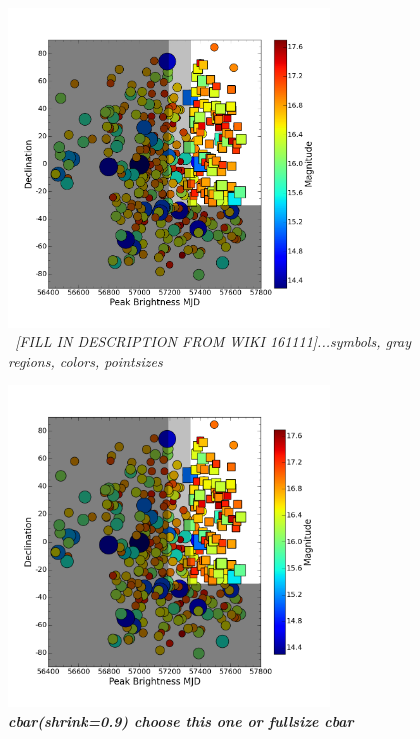 \documentclass[aps,prb,twocolumn,superscriptaddress]{revtex4-1}
\begin{document}
\begin{figure}[H]%
  \begin{center}
\centerline{\includegraphics[width=3.35in]{figures/invert_mag.png}}
\caption{\it \small{~[FILL IN DESCRIPTION FROM WIKI 161111]...symbols, gray regions, colors, pointsizes \label{fig:dec_mjd}}}
  \end{center}
\end{figure}

\begin{figure}[H]%
  \begin{center}
\centerline{\includegraphics[width=3.35in]{figures/invert_mag_shrink_9.png}}
\caption{\it \small{{\bf cbar(shrink=0.9) choose this one or fullsize cbar} \label{fig:dec_mjd}}}
  \end{center}
\end{figure}
\end{document}
